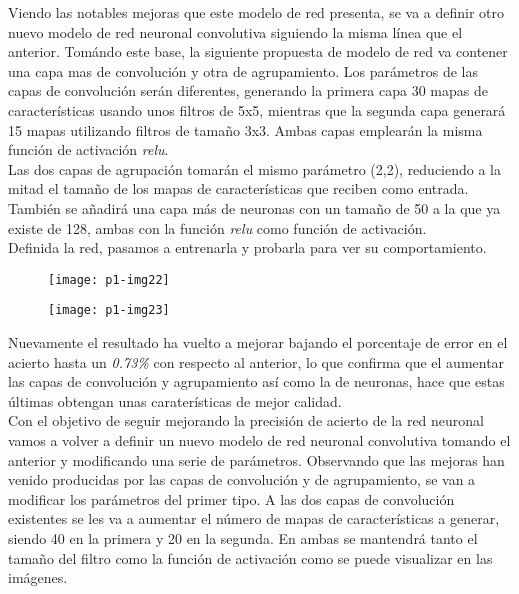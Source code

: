\documentclass[10pt]{article}
\begin{document}
Viendo las notables mejoras que este modelo de red presenta, se va a definir otro nuevo modelo de red neuronal convolutiva siguiendo la misma línea que el anterior. Tomándo este base, la siguiente propuesta de modelo de red va contener una capa mas de convolución y otra de agrupamiento. Los parámetros de las capas de convolución serán diferentes, generando la primera capa 30 mapas de características usando unos filtros de 5x5, mientras que la segunda capa generará 15 mapas utilizando filtros de tamaño 3x3. Ambas capas emplearán la misma función de activación \textit{relu}. \\

Las dos capas de agrupación tomarán el mismo parámetro (2,2), reduciendo a la mitad el tamaño de los mapas de características que reciben como entrada. También se añadirá una capa más de neuronas con un tamaño de 50 a la que ya existe de 128, ambas con la función \textit{relu} como función de activación. \\

Definida la red, pasamos a entrenarla y probarla para ver su comportamiento. \\

\begin{figure}[H]
	\begin{center}
 		\texttt{[image: p1-img22]}
	\end{center} 
\end{figure}

\begin{figure}[H]
	\begin{center}
 		\texttt{[image: p1-img23]}
	\end{center} 
\end{figure}


Nuevamente el resultado ha vuelto a mejorar bajando el porcentaje de error en el acierto hasta un \textit{0.73\%} con respecto al anterior, lo que confirma que el aumentar las capas de convolución y agrupamiento así como la de neuronas, hace que estas últimas obtengan unas caraterísticas de mejor calidad. \\

Con el objetivo de seguir mejorando la precisión de acierto de la red neuronal vamos a volver a definir un nuevo modelo de red neuronal convolutiva tomando el anterior y modificando una serie de parámetros. Observando que las mejoras han venido producidas por las capas de convolución y de agrupamiento, se van a modificar los parámetros del primer tipo. A las dos capas de convolución existentes se les va a aumentar el número de mapas de características a generar, siendo 40 en la primera y 20 en la segunda. En ambas se mantendrá tanto el tamaño del filtro como la función de activación como se puede visualizar en las imágenes. \\
\end{document}
